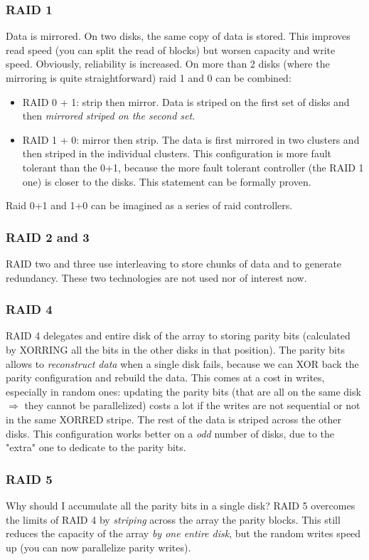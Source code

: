 \documentclass{article}
\begin{document}
				\subsubsection{RAID 1}
					Data is mirrored. On two disks, the same copy of data is stored. This improves read speed (you can split the read of blocks) but worsen capacity and write speed. Obviously, reliability is increased. On more than 2 disks (where the mirroring is quite straightforward) raid 1 and 0 can be combined:
					\begin{itemize}
						\item RAID 0 + 1: strip then mirror. Data is striped on the first set of disks and then \emph{mirrored striped on the second set}. 
						\item RAID 1 + 0: mirror then strip. The data is first mirrored in two clusters and then striped in the individual clusters. This configuration is more fault tolerant than the 0+1, because the more fault tolerant controller (the RAID 1 one) is closer to the disks. This statement can be formally proven. 
					\end{itemize}
					Raid 0+1 and 1+0 can be imagined as a series of raid controllers.
					
				\subsubsection{RAID 2 and 3}
					RAID two and three use interleaving to store chunks of data and to generate redundancy. These two technologies are not used nor of interest now.
					
				
				\subsubsection{RAID 4}
				RAID 4 delegates and entire disk of the array to storing parity bits (calculated by XORRING all the bits in the other disks in that position). The parity bits allows to \emph{reconstruct data} when a single disk fails, because we can XOR back the parity configuration and rebuild the data. This comes at a cost in writes, especially in random ones: updating the parity bits (that are all on the same disk $\Rightarrow$ they cannot be parallelized) costs a lot if the writes are not sequential or not in the same XORRED stripe. The rest of the data is striped across the other disks. This configuration works better on a \textit{odd} number of disks, due to the "extra" one to dedicate to the parity bits.
				
				\subsubsection{RAID 5}
					Why should I accumulate all the parity bits in a single disk? RAID 5 overcomes the limits of RAID 4 by \emph{striping} across the array the parity blocks. This still reduces the capacity of the array \emph{by one entire disk}, but the random writes speed up (you can now parallelize parity writes).\\
					
\end{document}
